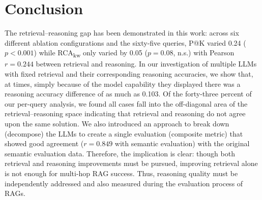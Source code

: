 \documentclass[11pt,a4paper]{article}
\begin{document}
\section{Conclusion}

The retrieval--reasoning gap has been demonstrated in this work:
across six different ablation configurations and the sixty-five
queries, P@K varied 0.24 ($p{<}0.001$) while RCA\textsubscript{kw}
only varied by 0.05 ($p{=}0.08$, n.s.) with Pearson $r{=}0.244$
between retrieval and reasoning.
In our investigation of multiple LLMs with fixed retrieval and their
corresponding reasoning accuracies, we show that, at times, simply
because of the model capability they displayed there was a reasoning
accuracy difference of as much as 0.103.
Of the forty-three percent of our per-query analysis, we found all
cases fall into the off-diagonal area of the retrieval--reasoning
space indicating that retrieval and reasoning do not agree upon the
same solution.
We also introduced an approach to break down (decompose) the LLMs to
create a single evaluation (composite metric) that showed good
agreement ($r{=}0.849$ with semantic evaluation) with the original
semantic evaluation data.
Therefore, the implication is clear: though both retrieval and
reasoning improvements must be pursued, improving retrieval alone is
not enough for multi-hop RAG success.
Thus, reasoning quality must be independently addressed and also
measured during the evaluation process of RAGs.



\end{document}
